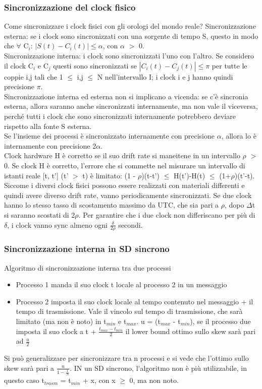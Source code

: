 \documentclass{article}
\begin{document}
\subsubsection{Sincronizzazione del clock fisico}
Come sincronizzare i clock fisici con gli orologi del mondo reale? Sincronizzazione esterna: se i clock sono sincronizzati con una sorgente di tempo S, questo in modo che $\forall$ C$_i$: $|S(t) - C_i(t)| \leq \alpha$, con $\alpha$ $>$ 0.\\ Sincronizzazione interna: i clock sono sincronizzati l'uno con l'altro. Se considero il clock C$_i$ e C$_j$ questi sono sincronizzati se $|C_i(t) - C_j(t)| \leq \pi$ per tutte le coppie i,j tali che 1 $\leq$ i,j $\leq$ N nell'intervallo I; i clock i e j hanno quindi precisione $\pi$.\\ Sincronizzazione interna ed esterna non si implicano a vicenda: se c'è sincronia esterna, allora saranno anche sincronizzati internamente, ma non vale il viceversa, perché tutti i clock che sono sincronizzati internamente potrebbero deviare rispetto alla fonte S esterna.\\ Se l'insieme dei processi è sincronizzato internamente con precisione $\alpha$, allora lo è internamente con precisione 2$\alpha$.\\ Clock hardware H è corretto se il suo drift rate si maneitene in un intervallo $\rho$ $>$ 0. Se clock H è corretto, l'errore che si commette nel misurare un intervallo di istanti reale [t, t'] (t' $>$ t) è limitato: (1 - $\rho$)(t-t') $\leq$ H(t')-H(t) $\leq$ (1+$\rho$)(t'-t).\\ Siccome i diversi clock fisici possono essere realizzati con materiali differenti e quindi avere diverso drift rate, vanno periodicamente sincronizzati. Se due clock hanno lo stesso tasso di scostamento massimo da UTC, che sia pari a $\rho$, dopo $\Delta$t si saranno scostati di 2$\rho$. Per garantire che i due clock non differiscano per più di $\delta$, i clock vanno sync almeno ogni $\frac{\delta}{2\rho}$ secondi.
\subsubsection{Sincronizzazione interna in SD sincrono}
Algoritmo di sincronizzazione interna tra due processi
\begin{itemize}
\item Processo 1 manda il suo clock t locale al processo 2 in un messaggio
\item Processo 2 imposta il suo clock locale al tempo contenuto nel messaggio + il tempo di trasmissione. Vale il vincolo sul tempo di trasmissione, che sarà limitato (ma non è noto) in t$_{min}$ e t$_{max}$. u = (t$_{max}$ - t$_{min}$), se il processo due imposta il suo clock a t + $\frac{t_{max} - t_{min}}{2}$ il lower bound ottimo sullo skew sarà pari ad $\frac{u}{2}$
\end{itemize}
Si può generalizzare per sincronizzare tra n processi e si vede che l'ottimo sullo skew sarà pari a $\frac{u}{1 - \frac{1}{N}}$. IN un SD sincrono, l'algoritmo non è più utilizzabile, in questo caso t$_{trasm}$ = t$_{min}$ + x, con x $\geq$ 0, ma non noto.
\end{document}

